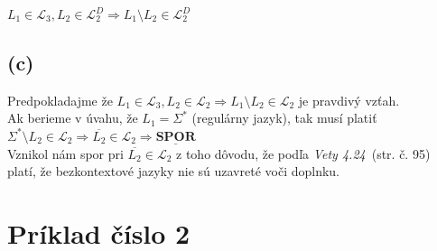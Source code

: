 \documentclass[11pt,a4paper]{article}
\begin{document}
\begin{center}
$L_1 \in \mathcal{L}_3, L_2 \in \mathcal{L}_2^D \Rightarrow L_1 \setminus L_2 \in \mathcal{L}_2^D$
\end{center}


\subsection{(c)} %


Predpokladajme že $L_1 \in \mathcal{L}_3, L_2 \in \mathcal{L}_2 \Rightarrow L_1 \setminus L_2 \in \mathcal{L}_2$ je pravdivý vzťah.\\

Ak berieme v úvahu, že $L_1 = \Sigma^*$ (regulárny jazyk), tak musí platiť $\Sigma^* \setminus L_2 \in \mathcal{L}_2 \Rightarrow \overline{L_2} \in \mathcal{L}_2 \Rightarrow \underline{\textbf{SPOR}}$\\

Vznikol nám spor pri $\overline{L_2} \in \mathcal{L}_2$ z toho dôvodu, že podľa \textit{Vety 4.24}~\cite{TIN}(str. č. 95) platí, že bezkontextové jazyky nie sú uzavreté voči doplnku.

\newpage
\section{Príklad číslo 2} %
\end{document}
